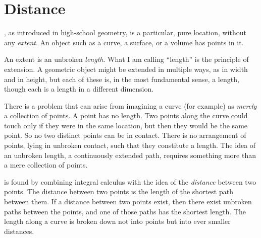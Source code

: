 \documentclass[nobib]{tufte-book}
\begin{document}


\mainmatter

\chapter{Distance}
\label{ch:distance}

, as introduced in high-school geometry, is a particular,
pure location, without any \emph{extent}.  An object such as a curve, a
surface, or a volume has points in it.

An extent is an unbroken \emph{length}.  What I am calling ``length'' is the
principle of extension.  A geometric object might be extended in multiple ways,
as in width and in height, but each of these is, in the most fundamental sense,
a length, though each is a length in a different dimension.

There is a problem that can arise from imagining a curve (for example) as
\emph{merely} a collection of points.  A point has no length.  Two points along
the curve could touch only if they were in the same location, but then they
would be the same point.  So no two distinct points can be in contact.  There
is no arrangement of points, lying in unbroken contact, such that they
constitute a length.  The idea of an unbroken length, a continuously extended
path, requires something more than a mere collection of points.

 is found by combining integral calculus with the idea
of the \emph{distance} between two points.  The distance between two points is
the length of the shortest path between them.  If a distance between two points
exist, then there exist unbroken paths between the points, and one of those
paths has the shortest length.  The length along a curve is broken down not
into points but into ever smaller distances.
\end{document}
